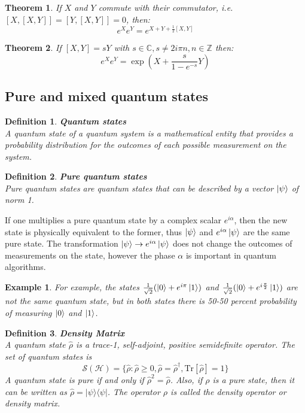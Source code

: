 \documentclass[12pt, a4paper,  nobibnotes]{article}
\newcommand{\ketbra}[2]{|#1\rangle\langle#2|}
\newcommand{\Tr}[1]{\mathrm{Tr}\left[#1\right]}
\newtheorem*{example*}{Example}
\newtheorem{theorem}{Theorem}
\newtheorem{definition}{Definition}
\begin{document}
\begin{theorem}
    If $X$ and $Y$ commute with their commutator, i.e. $[X, [X,Y]] = [Y, [X,Y]] = 0$, then:
    \begin{equation*}
        e^Xe^Y = e^{X+Y+\frac{1}{2}[X,Y]}
    \end{equation*}
\end{theorem}

\begin{theorem}
    If $[X,Y] = sY$ with $s\in\mathbb{C}, s\neq 2i\pi n, n\in \mathbb Z$ then:
    \begin{equation*}
        e^Xe^Y = \exp\left(X + \frac{s}{1-e^{-s}}Y \right)
    \end{equation*}
\end{theorem}

\subsection{Pure and mixed quantum states}
\begin{definition}
    \textbf{Quantum states}\\
    A quantum state of a quantum system is a mathematical entity that provides a probability distribution 
    for the outcomes of each possible measurement on the system.
\end{definition}

\begin{definition}
    \textbf{Pure quantum states}\\
    Pure quantum states are quantum states that can be described by a vector $\ket\psi$ of norm 1. 
\end{definition}
If one multiplies a pure quantum state by a complex scalar $e^{i\alpha}$, then the new state is 
physically equivalent to the former, thus $\ket\psi$ and $e^{i\alpha}\ket\psi$ are 
the same pure state.
The transformation $\ket\psi\rightarrow e^{i\alpha}\ket\psi$ does not change the outcomes of measurements on the state,
however the phase $\alpha$ is important in quantum algorithms.
\begin{example*}
    For example, the states $\frac{1}{\sqrt 2}(\ket 0 + e^{i\pi}\ket 1)$ and $\frac{1}{\sqrt 2}(\ket 0 + e^{i\frac{\pi}{2}}\ket 1)$
    are not the same quantum state, but in both states there is 50-50 percent probability of measuring $\ket 0$ and $\ket 1$.
\end{example*}

\begin{definition}
    \textbf{Density Matrix}\\
    A quantum state $\hat\rho$ is a trace-1, self-adjoint, positive semidefinite operator.
    The set of quantum states is
    \begin{equation*}
        \mathcal{S(H)} = \{ \hat\rho : \hat\rho \geq 0, \hat\rho=\hat\rho^{\dagger}, \Tr{\hat\rho} = 1 \}
    \end{equation*}
    A quantum state is pure if and only if $\hat\rho^2=\hat\rho$. 
    Also, if $\rho$ is a pure state, then it can be written as $\hat\rho = \ketbra{\psi}{\psi}$.
    The operator $\rho$ is called the \textit{density operator} or \textit{density matrix}.
    \label{def:densityop}
\end{definition}
\end{document}
